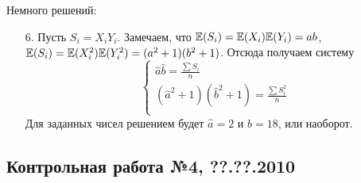 \documentclass[12pt, a4paper]{article}\usepackage[]{graphicx}\usepackage[]{color}
\begin{document}
Немного решений:

\begin{enumerate}
  \item[6.] Пусть $S_i = X_i Y_i$. Замечаем, что $\mathbb{E}(S_i)=\mathbb{E}(X_i)\mathbb{E}(Y_i)=ab$, $\mathbb{E}(S_i)=\mathbb{E}(X_i^2)\mathbb{E}(Y_i^2)=(a^2+1)(b^2+1)$. Отсюда получаем систему
  \[
  \begin{cases}
  \hat a \hat b = \frac{\sum S_i}{n} \\
  (\hat a^2 + 1) (\hat b^2 + 1) = \frac{\sum S_i^2}{n} \\
  \end{cases}
  \]
  Для заданных чисел решением будет $\hat a = 2$ и $\hat b = 18$, или наоборот.
\end{enumerate}



\subsection{Контрольная работа №4, ??.??.2010}
\end{document}
